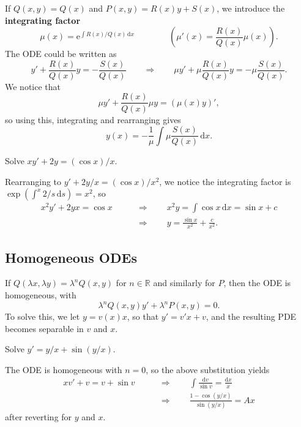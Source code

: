 \documentclass[letter-paper]{tufte-book}
\newenvironment{example}[1][Example]{\begin{trivlist}
\item[\hskip \labelsep {\bfseries #1}]}{\end{trivlist}}
\newcommand{\ex}{\mathrm{e}}
\newcommand\Def[1]{\textbf{#1}}
\begin{document}
If $Q(x,y)=Q(x)$ and $P(x,y)=R(x)y+S(x)$, we introduce the
\Def{integrating factor}
\begin{equation*}
  \mu(x)=\ex^{\int R(x)/Q(x)\, \mathrm{d}x}\qquad\qquad
  \left(\mu'(x)=\frac{R(x)}{Q(x)}\mu(x)\right).
\end{equation*}
The ODE could be written as
\begin{equation*}
  y'+\frac{R(x)}{Q(x)}y=-\frac{S(x)}{Q(x)}\qquad\Rightarrow\qquad
  \mu y'+\mu\frac{R(x)}{Q(x)}y=-\mu\frac{S(x)}{Q(x)}.
\end{equation*}
We notice that
\begin{equation*}
  \mu y'+\frac{R(x)}{Q(x)}\mu y=\left(\mu(x)y\right)',
\end{equation*}
so using this, integrating and rearranging gives
\begin{equation*}
  y(x)=-\frac{1}{\mu}\int\mu\frac{S(x)}{Q(x)}\, \mathrm{d}x.
\end{equation*}
\begin{example}
  Solve $xy'+2y=(\cos x)/x$.
  
  Rearranging to $y'+2y/x=(\cos x)/x^2$, we notice the integrating factor is
  $\exp(\int^x 2/s\, \mathrm{d}s)=x^2$, so
  \begin{align*}
    x^2 y'+2yx = \cos x\qquad &\Rightarrow \qquad x^2y=\int\cos x\, \mathrm{d}x= \sin x + c\\
    &\Rightarrow \qquad y=\frac{\sin x}{x^2}+\frac{c}{x^2}.
  \end{align*}
\end{example}

\subsection{Homogeneous ODEs}

If $Q(\lambda x,\lambda y)=\lambda^n Q(x,y)$ for $n\in\mathbb{R}$ and similarly
for $P$, then the ODE is homogeneous, with
\begin{equation*}
  \lambda^n Q(x,y) y'+\lambda^n P(x,y)=0.
\end{equation*}
To solve this, we let $y=v(x)x$, so that $y'=v'x+v$, and the resulting PDE
becomes separable in $v$ and $x$.
\begin{example}
  Solve $y'=y/x + \sin(y/x)$.
  
  The ODE is homogeneous with $n=0$, so the above substitution yields
  \begin{align*}
    xv'+v=v+\sin v \qquad &\Rightarrow \qquad
    \int\frac{\mathrm{d}v}{\sin v}=\frac{\mathrm{d}x}{x}\\
      &\Rightarrow \qquad \frac{1-\cos(y/x)}{\sin(y/x)}=Ax    
  \end{align*}
  after reverting for $y$ and $x$.
\end{example}
\end{document}
